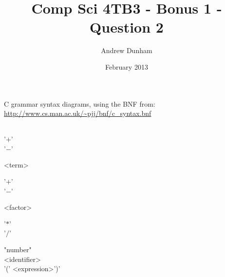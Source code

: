 \documentclass{article}
\title{Comp Sci 4TB3 - Bonus 1 - Question 2}
\author{Andrew Dunham}
\date{February 2013}
\begin{document}
\maketitle

\noindent C grammar syntax diagrams, using the BNF from: \url{http://www.cs.man.ac.uk/~pjj/bnf/c_syntax.bnf}


\begin{syntdiag}
\begin{stack}
\\'$+$'\\'$-$'
\end{stack}
\begin{rep} <term>\\ 
\begin{stack}'$+$'\\'$-$'
\end{stack}
\end{rep}
\end{syntdiag}

\begin{syntdiag}
\begin{rep} <factor>\\ \begin{stack}'$*$'\\'$/$'\end{stack}\end{rep}
\end{syntdiag}

\begin{syntdiag}
\begin{stack} "number"\\<identifier>\\'(' <expression>')'\end{stack}
\end{syntdiag}
\end{document}
